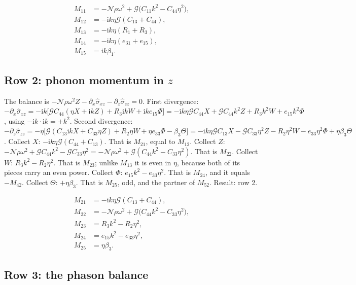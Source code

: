 \documentclass[11pt]{article}
\makeatletter
\newif\ifshowworked
\newenvironment{worked}{%
  \ifshowworked\par\smallskip\noindent\textit{Working.}\par\smallskip\else
  \setbox\z@\vbox\bgroup\fi}{\ifshowworked\par\smallskip\else\egroup\fi}
\newcommand{\ii}{\mathrm{i}}
\newcommand{\Ncal}{\mathcal{N}}
\newcommand{\Gcal}{\mathcal{G}}
\makeatother
\begin{document}
\begin{align}
M_{11}&=-\Ncal\rho\omega^2+\Gcal\bigl(C_{11}k^2-C_{44}\eta^2\bigr), \\
M_{12}&=-\ii k\eta\Gcal(C_{13}+C_{44}), \\
M_{13}&=-\ii k\eta(R_1+R_3), \\
M_{14}&=-\ii k\eta(e_{31}+e_{15}), \\
M_{15}&=\ii k\beta_1 .
\end{align}

\subsection*{Row 2: phonon momentum in $z$}

\begin{worked}
The balance is $-\Ncal\rho\omega^2Z-\partial_x\hat\sigma_{xz}-\partial_z\hat\sigma_{zz}=0$.
First divergence: $-\partial_x\hat\sigma_{xz}
=-\ii k\bigl[\Gcal C_{44}(\eta X+\ii kZ)+R_3\ii kW+\ii ke_{15}\Phi\bigr]
=-\ii k\eta\Gcal C_{44}X+\Gcal C_{44}k^2Z+R_3k^2W+e_{15}k^2\Phi$, using $-\ii k\cdot\ii k=+k^2$.
Second divergence: $-\partial_z\hat\sigma_{zz}
=-\eta\bigl[\Gcal(C_{13}\ii kX+C_{33}\eta Z)+R_2\eta W+\eta e_{33}\Phi-\beta_3\Theta\bigr]
=-\ii k\eta\Gcal C_{13}X-\Gcal C_{33}\eta^2Z-R_2\eta^2W-e_{33}\eta^2\Phi+\eta\beta_3\Theta$.
Collect $X$: $-\ii k\eta\Gcal(C_{44}+C_{13})$. That is $M_{21}$, equal to $M_{12}$.
Collect $Z$: $-\Ncal\rho\omega^2+\Gcal C_{44}k^2-\Gcal C_{33}\eta^2
=-\Ncal\rho\omega^2+\Gcal(C_{44}k^2-C_{33}\eta^2)$. That is $M_{22}$.
Collect $W$: $R_3k^2-R_2\eta^2$. That is $M_{23}$; unlike $M_{13}$ it is even in $\eta$, because both of
its pieces carry an even power.
Collect $\Phi$: $e_{15}k^2-e_{33}\eta^2$. That is $M_{24}$, and it equals $-M_{42}$.
Collect $\Theta$: $+\eta\beta_3$. That is $M_{25}$, odd, and the partner of $M_{52}$.
Result: row 2.
\end{worked}

\begin{align}
M_{21}&=-\ii k\eta\Gcal(C_{13}+C_{44}), \\
M_{22}&=-\Ncal\rho\omega^2+\Gcal\bigl(C_{44}k^2-C_{33}\eta^2\bigr), \\
M_{23}&=R_3k^2-R_2\eta^2, \\
M_{24}&=e_{15}k^2-e_{33}\eta^2, \\
M_{25}&=\eta\beta_3 .
\end{align}

\subsection*{Row 3: the phason balance}
\end{document}
